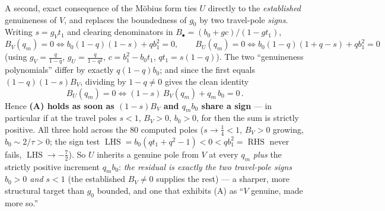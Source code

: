 \begin{remark}\label{rem:signred}
A second, exact consequence of the M\"obius form ties $U$ directly to the \emph{established} genuineness
of $V$, and replaces the boundedness of $g_0$ by two travel-pole \emph{signs}. Writing $s=g_Vt_1$ and
clearing denominators in $B_\bullet=(b_0+gc)/(1-gt_1)$,
\[
   B_V(q_m)=0\iff b_0(1-q)(1-s)+qb_1^2=0,\qquad
   B_U(q_m)=0\iff b_0(1-q)(1+q-s)+qb_1^2=0
\]
(using $g_V=\tfrac q{1-q}$, $g_U=\tfrac q{1-q^2}$, $c=b_1^2-b_0t_1$, $qt_1=s(1-q)$). The two
``genuineness polynomials'' differ by exactly $q(1-q)b_0$; and since the first equals
$(1-q)(1-s)B_V$, dividing by $1-q\ne0$ gives the clean identity
\[
   \boxed{\,B_U(q_m)=0\iff (1-s)\,B_V(q_m)+q_m\,b_0=0\,}.
\]
Hence \textbf{(A) holds as soon as $(1-s)B_V$ and $q_mb_0$ share a sign} --- in particular if at the
travel poles $s<1$, $B_V>0$, $b_0>0$, for then the sum is strictly positive. All three hold across the
$80$ computed poles ($s\to\tfrac14<1$, $B_V>0$ growing, $b_0\sim2/\tau>0$; the sign test
$\operatorname{LHS}=b_0(qt_1+q^2-1)<0<qb_1^2=\operatorname{RHS}$ never fails, $\operatorname{LHS}\to-\tfrac72$).
So $U$ inherits a genuine pole from $V$ at every $q_m$ \emph{plus} the strictly positive increment
$q_mb_0$: \emph{the residual is exactly the two travel-pole signs $b_0>0$ and $s<1$} (the established
$B_V\ne0$ supplies the rest) --- a sharper, more structural target than $g_0$ bounded, and one that
exhibits (A) as ``$V$ genuine, made more so.''
\end{remark}

